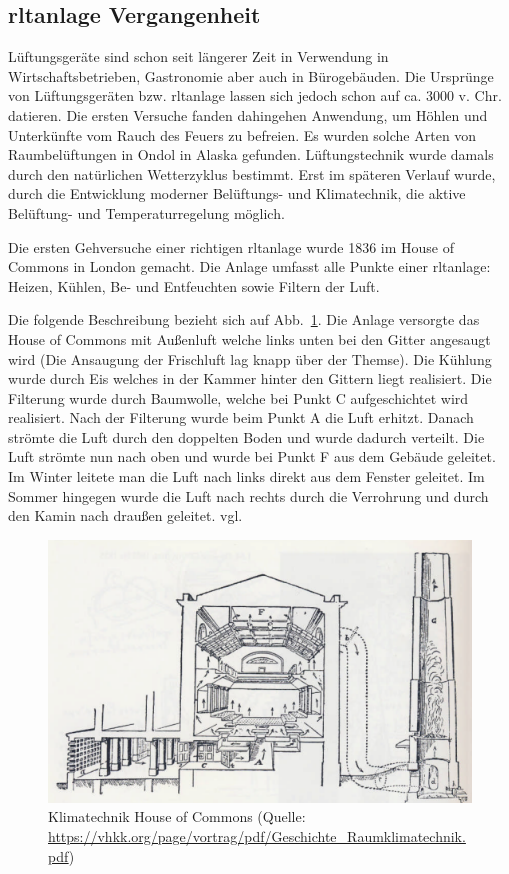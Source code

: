 \subsection{\ac{rltanlage} Vergangenheit}
Lüftungsgeräte sind schon seit längerer Zeit in Verwendung \zB in Wirtschaftsbetrieben, Gastronomie aber auch in Bürogebäuden. Die Ursprünge von Lüftungsgeräten bzw. \ac{rltanlage} lassen sich jedoch schon auf ca. 3000 v. Chr. datieren.
Die ersten Versuche fanden dahingehen Anwendung, um Höhlen und Unterkünfte vom Rauch des Feuers zu befreien. Es wurden solche Arten von Raumbelüftungen \zB in Ondol in Alaska gefunden.
Lüftungstechnik wurde damals durch den natürlichen Wetterzyklus bestimmt. 
Erst im späteren Verlauf wurde, durch die Entwicklung moderner Belüftungs- und Klimatechnik, die aktive Belüftung- und Temperaturregelung möglich.

Die ersten Gehversuche einer richtigen \acs{rltanlage} wurde 1836 im House of Commons in London gemacht. Die Anlage umfasst alle Punkte einer \acs{rltanlage}: Heizen, Kühlen, Be- und Entfeuchten sowie Filtern der Luft. 

Die folgende Beschreibung bezieht sich auf
Abb.~\ref{fig:House_of_Commons_Klimatechnik}.
Die Anlage versorgte das House of Commons mit Außenluft welche links unten bei den Gitter angesaugt wird (Die Ansaugung der Frischluft lag knapp über der Themse). Die Kühlung wurde durch Eis welches in der Kammer hinter den Gittern liegt realisiert.
Die Filterung wurde durch Baumwolle, welche bei Punkt C aufgeschichtet wird realisiert.
Nach der Filterung wurde beim Punkt A die Luft erhitzt. 
Danach strömte die Luft durch den doppelten Boden und wurde dadurch verteilt. Die Luft strömte nun nach oben und wurde bei Punkt F aus dem Gebäude geleitet. Im Winter leitete man die Luft nach links direkt aus dem Fenster geleitet. Im Sommer hingegen wurde die Luft nach rechts durch die Verrohrung und durch den Kamin  nach draußen geleitet. vgl.
\cite[vgl.][]{Fitzner_Finke:2010} 

\begin{figure}[ht]
	\centering
	\includegraphics[width=0.6\linewidth]{Bilder/Belueftung_House_of_Commons}
	\caption{Klimatechnik House of Commons  (Quelle: \url{https://vhkk.org/page/vortrag/pdf/Geschichte_Raumklimatechnik.pdf})}
	\label{fig:House_of_Commons_Klimatechnik}
\end{figure}




